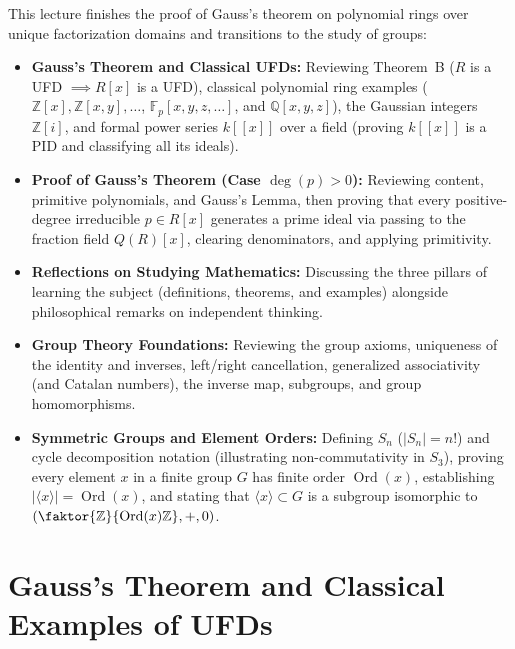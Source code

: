 \begin{overview}
This lecture finishes the proof of Gauss's theorem on polynomial rings over unique factorization domains and transitions to the study of groups:
\begin{itemize}
    \item \textbf{Gauss's Theorem and Classical UFDs:} Reviewing Theorem~B ($R$ is a UFD $\implies R[x]$ is a UFD), classical polynomial ring examples ($\mathbb{Z}[x], \mathbb{Z}[x,y], \dots$, $\mathbb{F}_p[x,y,z,\dots]$, and $\mathbb{Q}[x,y,z]$), the Gaussian integers $\mathbb{Z}[i]$, and formal power series $k[[x]]$ over a field (proving $k[[x]]$ is a PID and classifying all its ideals).
    \item \textbf{Proof of Gauss's Theorem (Case $\deg(p) > 0$):} Reviewing content, primitive polynomials, and Gauss's Lemma, then proving that every positive-degree irreducible $p \in R[x]$ generates a prime ideal via passing to the fraction field $Q(R)[x]$, clearing denominators, and applying primitivity.
    \item \textbf{Reflections on Studying Mathematics:} Discussing the three pillars of learning the subject (definitions, theorems, and examples) alongside philosophical remarks on independent thinking.
    \item \textbf{Group Theory Foundations:} Reviewing the group axioms, uniqueness of the identity and inverses, left/right cancellation, generalized associativity (and Catalan numbers), the inverse map, subgroups, and group homomorphisms.
    \item \textbf{Symmetric Groups and Element Orders:} Defining $S_n$ ($|S_n| = n!$) and cycle decomposition notation (illustrating non-commutativity in $S_3$), proving every element $x$ in a finite group $G$ has finite order $\operatorname{Ord}(x)$, establishing $|\langle x \rangle| = \operatorname{Ord}(x)$, and stating that $\langle x \rangle \subset G$ is a subgroup isomorphic to $(\faktor{\mathbb{Z}}{\operatorname{Ord}(x)\mathbb{Z}}, +, 0)$.
\end{itemize}
\end{overview}

\section{Gauss's Theorem and Classical Examples of UFDs}

